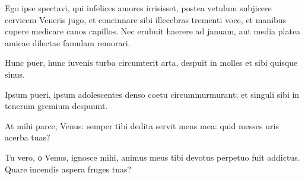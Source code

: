 \noindent Ego ipse spectavi, qui infelices amores irrisisset, postea vetulum subjicere cervicem Veneris jugo, et concinnare sibi illecebras trementi voce, et manibus cupere medicare canos capillos. Nec erubuit haerere ad januam, aut media platea amicae dilectae famulam remorari. \\

{\large

\noindent Hunc puer, hunc iuvenis turba circumterit arta, despuit in molles et sibi quisque sinus.\\

}


\noindent Ipsum pueri, ipsum adolescentes denso coetu circummurmurant; et singuli sibi in tenerum gremium despuunt. \\

{\large

\noindent At mihi parce, Venus: semper tibi dedita servit mens mea: quid messes uris acerba tuas?\\

}

\noindent Tu vero, о Venus, ignosce mihi, animus meus tibi devotus perpetuo fuit addictus. Quare incendis aspera fruges tuas?\\

